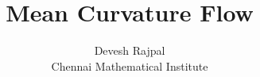 \documentclass[11pt,twoside=semi]{scrbook}
\begin{document}
\title{Mean Curvature Flow}
\author{Devesh Rajpal \\ Chennai Mathematical Institute}
\date{}
\publishers{Adviser: Prof. Ben Andrews }
\frontmatter
\maketitle
\setcounter{page}{4}
 


\mainmatter
\tableofcontents   




\appendix
%
%
\backmatter
\nocite{*}
\end{document}

